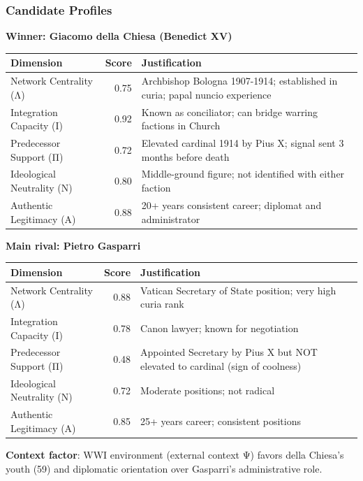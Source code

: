 \subsubsection{Candidate Profiles}

\textbf{Winner: Giacomo della Chiesa (Benedict XV)}

\begin{center}
\begin{tabular}{lrp{4cm}}
\toprule
\textbf{Dimension} & \textbf{Score} & \textbf{Justification} \\
\midrule
Network Centrality (Λ) & 0.75 & Archbishop Bologna 1907-1914; established in curia; papal nuncio experience \\
Integration Capacity (Ι) & 0.92 & Known as conciliator; can bridge warring factions in Church \\
Predecessor Support (Π) & 0.72 & Elevated cardinal 1914 by Pius X; signal sent 3 months before death \\
Ideological Neutrality (Ν) & 0.80 & Middle-ground figure; not identified with either faction \\
Authentic Legitimacy (Α) & 0.88 & 20+ years consistent career; diplomat and administrator \\
\bottomrule
\end{tabular}
\end{center}

\textbf{Main rival: Pietro Gasparri}

\begin{center}
\begin{tabular}{lrp{4cm}}
\toprule
\textbf{Dimension} & \textbf{Score} & \textbf{Justification} \\
\midrule
Network Centrality (Λ) & 0.88 & Vatican Secretary of State position; very high curia rank \\
Integration Capacity (Ι) & 0.78 & Canon lawyer; known for negotiation \\
Predecessor Support (Π) & 0.48 & Appointed Secretary by Pius X but NOT elevated to cardinal (sign of coolness) \\
Ideological Neutrality (Ν) & 0.72 & Moderate positions; not radical \\
Authentic Legitimacy (Α) & 0.85 & 25+ years career; consistent positions \\
\bottomrule
\end{tabular}
\end{center}

\textbf{Context factor}: WWI environment (external context Ψ) favors della Chiesa's youth (59) and diplomatic orientation over Gasparri's administrative role.


